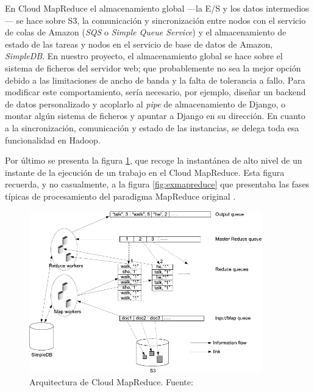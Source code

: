 En Cloud MapReduce el almacenamiento global ---la E/S y los datos intermedios--- se hace sobre S3, la comunicaci\'on y sincronizaci\'on entre nodos con el servicio de colas de Amazon (\emph{SQS} o \emph{Simple Queue Service}) y el almacenamiento de estado de las tareas y nodos en el servicio de base de datos de Amazon, \emph{SimpleDB}. En nuestro proyecto, el almacenamiento global se hace sobre el sistema de ficheros del servidor web; que probablemente no sea la mejor opci\'on debido a las limitaciones de ancho de banda y la falta de tolerancia a fallo. Para modificar este comportamiento, ser\'ia necesario, por ejemplo, dise\~nar un backend de datos personalizado y acoplarlo al \emph{pipe} de almacenamiento de Django, o montar alg\'un sistema de ficheros y apuntar a Django en su direcci\'on. En cuanto a la sincronizaci\'on, comunicaci\'on y estado de las instancias, se delega toda esa funcionalidad en Hadoop.\newline

Por \'ultimo se presenta la figura \ref{fig:arquitecturacloudmapreduce}, que recoge la instant\'anea de alto nivel de un instante de la ejecuci\'on de un trabajo en el Cloud MapReduce. Esta figura recuerda, y no casualmente, a la figura \ref{fig:exmapreduce} que presentaba las fases t\'ipicas de procesamiento del paradigma MapReduce original \cite{googlemapreduce}.

\begin{figure}[tbp]
\begin{center}
\includegraphics[width=0.9\textwidth]{imagenes/036.pdf}
 \caption{Arquitectura de Cloud MapReduce. Fuente: \cite{cloudmapreduce}}
\label{fig:arquitecturacloudmapreduce}
\end{center}
\end{figure}


